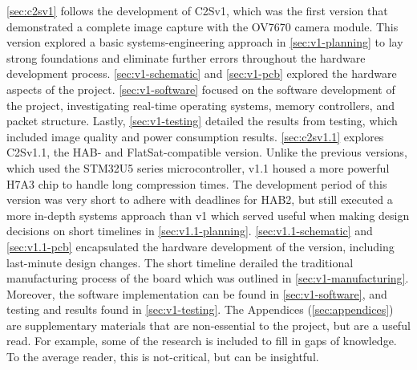 \nl
\autoref{sec:c2sv1} follows the development of C2Sv1, which was the first version that demonstrated a complete image capture with the OV7670 camera module. This version explored a basic systems-engineering approach in \autoref{sec:v1-planning} to lay strong foundations and eliminate further errors throughout the hardware development process.
\autoref{sec:v1-schematic} and \autoref{sec:v1-pcb} explored the hardware aspects of the project.
\autoref{sec:v1-software} focused on the software development of the project, investigating real-time operating systems, memory controllers, and packet structure.
Lastly, \autoref{sec:v1-testing} detailed the results from testing, which included image quality and power consumption results. 
\nl
\autoref{sec:c2sv1.1} explores C2Sv1.1, the HAB- and FlatSat-compatible version. Unlike the previous versions, which used the STM32U5 series microcontroller, v1.1 housed a more powerful H7A3 chip to handle long compression times.
The development period of this version was very short to adhere with deadlines for HAB2, but still executed a more in-depth systems approach than v1 which served useful when making design decisions on short timelines in \autoref{sec:v1.1-planning}.
\autoref{sec:v1.1-schematic} and \autoref{sec:v1.1-pcb} encapsulated the hardware development of the version, including last-minute design changes.
The short timeline derailed the traditional manufacturing process of the board which was outlined in \autoref{sec:v1-manufacturing}. Moreover, the software implementation can be found in \autoref{sec:v1-software}, and testing and results found in \autoref{sec:v1-testing}.
\nl
The Appendices (\autoref{sec:appendices}) are supplementary materials that are non-essential to the project, but are a useful read. For example, some of the research is included to fill in gaps of knowledge. To the average reader, this is not-critical, but can be insightful.
